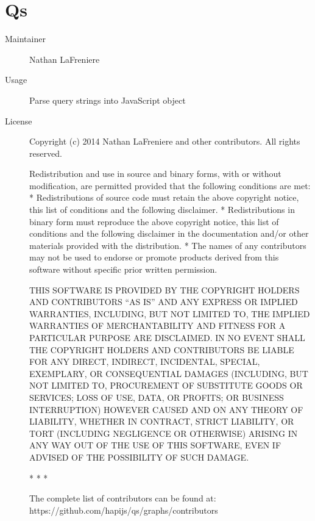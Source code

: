   \section*{Qs}
    \begin{description}
      \item[Maintainer] Nathan LaFreniere
      \item[Usage] Parse query strings into JavaScript object
      \item[License] \scriptsize Copyright (c) 2014 Nathan LaFreniere and other contributors.
        All rights reserved.

        Redistribution and use in source and binary forms, with or without
        modification, are permitted provided that the following conditions are met:
            * Redistributions of source code must retain the above copyright
              notice, this list of conditions and the following disclaimer.
            * Redistributions in binary form must reproduce the above copyright
              notice, this list of conditions and the following disclaimer in the
              documentation and/or other materials provided with the distribution.
            * The names of any contributors may not be used to endorse or promote
              products derived from this software without specific prior written
              permission.

        THIS SOFTWARE IS PROVIDED BY THE COPYRIGHT HOLDERS AND CONTRIBUTORS ``AS IS'' AND
        ANY EXPRESS OR IMPLIED WARRANTIES, INCLUDING, BUT NOT LIMITED TO, THE IMPLIED
        WARRANTIES OF MERCHANTABILITY AND FITNESS FOR A PARTICULAR PURPOSE ARE
        DISCLAIMED. IN NO EVENT SHALL THE COPYRIGHT HOLDERS AND CONTRIBUTORS BE LIABLE FOR ANY
        DIRECT, INDIRECT, INCIDENTAL, SPECIAL, EXEMPLARY, OR CONSEQUENTIAL DAMAGES
        (INCLUDING, BUT NOT LIMITED TO, PROCUREMENT OF SUBSTITUTE GOODS OR SERVICES;
        LOSS OF USE, DATA, OR PROFITS; OR BUSINESS INTERRUPTION) HOWEVER CAUSED AND
        ON ANY THEORY OF LIABILITY, WHETHER IN CONTRACT, STRICT LIABILITY, OR TORT
        (INCLUDING NEGLIGENCE OR OTHERWISE) ARISING IN ANY WAY OUT OF THE USE OF THIS
        SOFTWARE, EVEN IF ADVISED OF THE POSSIBILITY OF SUCH DAMAGE.

                                          *   *   *

        The complete list of contributors can be found at: https://github.com/hapijs/qs/graphs/contributors
    \end{description}

